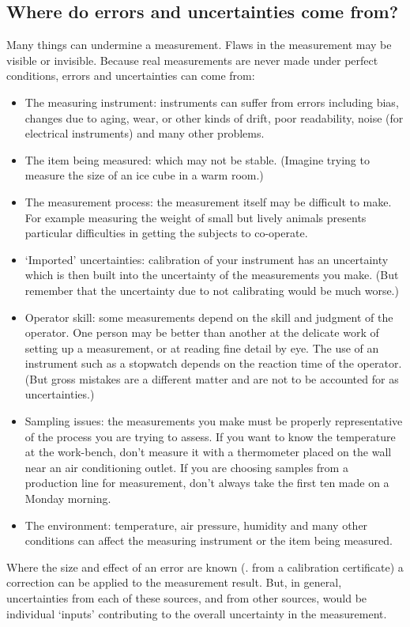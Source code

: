 \subsection{Where do errors and uncertainties come from?}
Many things can undermine a measurement. Flaws in the measurement may be visible or invisible. Because real measurements are never made under perfect conditions, errors and uncertainties can come from:
\begin{itemize}
\item The measuring instrument: instruments can suffer from errors including bias, changes due to aging, wear, or other kinds of drift, poor readability, noise (for electrical instruments) and many other problems.
%
\item The item being measured: which may not be stable. (Imagine trying to measure the size of an ice cube in a warm room.)
%
\item The measurement process: the measurement itself may be difficult to make. For example measuring the weight of small but lively animals presents particular difficulties in getting the subjects to co-operate.
%
\item `Imported' uncertainties: calibration of your instrument has an uncertainty which is then built into the uncertainty of the measurements you make. (But remember that the uncertainty due to not calibrating would be much worse.)
%
\item Operator skill: some measurements depend on the skill and judgment of the operator. One person may be better than another at the delicate work of setting up a measurement, or at reading fine detail by eye. The use of an instrument such as a stopwatch depends on the reaction time of the operator. (But gross mistakes are a different matter and are not to be accounted for as uncertainties.)
%
\item Sampling issues: the measurements you make must be properly representative of the process you are trying to assess. If you want to know the temperature at the work-bench, don't measure it with a thermometer placed on the wall near an air conditioning outlet. If you are choosing samples from a production line for measurement, don't always take the first ten made on a Monday morning.
%
\item The environment: temperature, air pressure, humidity and many other conditions can affect the measuring instrument or the item being measured.
\end{itemize}

Where the size and effect of an error are known (\eg. from a calibration certificate) a correction can be applied to the measurement result. But, in general, uncertainties from each of these sources, and from other sources, would be individual `inputs' contributing to the overall uncertainty in the measurement.


